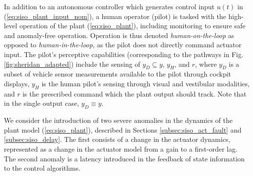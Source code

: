 In addition to an autonomous controller which generates control input $u(t)$ in (\ref{eq:siso_plant_input_nom}), a human operator (pilot) is tasked with the high-level operation of the plant (\ref{eq:siso_plant}), including monitoring to ensure safe and anomaly-free operation. Operation is thus denoted \textit{human-on-the-loop} as opposed to \textit{human-in-the-loop}, as the pilot does not directly command actuator input. The pilot's perceptive capabilities (corresponding to the pathways in Fig. \ref{fig:sheridan_adapted}) include the sensing of $y_{D} \subseteq y$, $y_{H}$, and $r$, where $y_{D}$ is a subset of vehicle sensor measurements available to the pilot through cockpit displays, $y_{H}$ is the human pilot's sensing through visual and vestibular modalities, and $r$ is the prescribed command which the plant output should track. Note that in the single output case, $y_D \equiv y$.


We consider the introduction of two severe anomalies in the dynamics of the plant model (\ref{eq:siso_plant}), described in Sections \ref{subsec:siso_act_fault} and \ref{subsec:siso_delay}. The first consists of a change in the actuator dynamics, represented as a change in the actuator model from a gain to a first-order lag. The second anomaly is a latency introduced in the feedback of state information to the control algorithms. 



